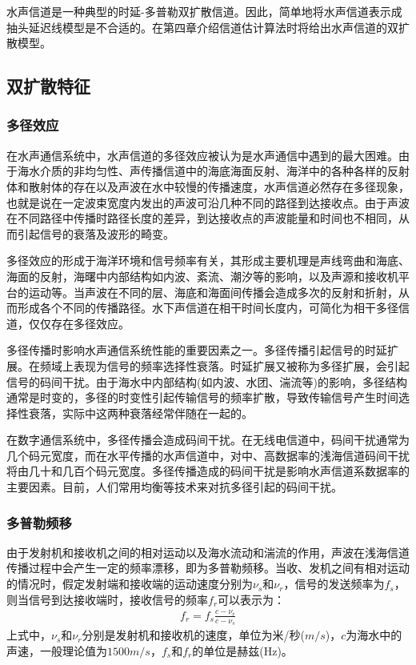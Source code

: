 水声信道是一种典型的时延-多普勒双扩散信道。因此，简单地将水声信道表示成抽头延迟线模型是不合适的。在第四章介绍信道估计算法时将给出水声信道的双扩散模型。
\subsection{双扩散特征}
\subsubsection*{多径效应}
在水声通信系统中，水声信道的多径效应被认为是水声通信中遇到的最大困难。由于海水介质的非均匀性、声传播信道中的海底海面反射、海洋中的各种各样的反射体和散射体的存在以及声波在水中较慢的传播速度，水声信道必然存在多径现象，也就是说在一定波束宽度内发出的声波可沿几种不同的路径到达接收点。由于声波在不同路径中传播时路径长度的差异，到达接收点的声波能量和时间也不相同，从而引起信号的衰落及波形的畸变。

多径效应的形成于海洋环境和信号频率有关，其形成主要机理是声线弯曲和海底、海面的反射，海曙中内部结构如内波、紊流、潮汐等的影响，以及声源和接收机平台的运动等。当声波在不同的层、海底和海面间传播会造成多次的反射和折射，从而形成各个不同的传播路径。水下声信道在相干时间长度内，可简化为相干多径信道，仅仅存在多径效应。

多径传播时影响水声通信系统性能的重要因素之一。多径传播引起信号的时延扩展。在频域上表现为信号的频率选择性衰落。时延扩展又被称为多径扩展，会引起信号的码间干扰。由于海水中内部结构(如内波、水团、湍流等)的影响，多径结构通常是时变的，多径的时变性引起传输信号的频率扩散，导致传输信号产生时间选择性衰落，实际中这两种衰落经常伴随在一起的。

在数字通信系统中，多径传播会造成码间干扰。在无线电信道中，码间干扰通常为几个码元宽度，而在水平传播的水声信道中，对中、高数据率的浅海信道码间干扰将由几十和几百个码元宽度。多径传播造成的码间干扰是影响水声信道系数据率的主要因素。目前，人们常用均衡等技术来对抗多径引起的码间干扰。
\subsubsection*{多普勒频移}
由于发射机和接收机之间的相对运动以及海水流动和湍流的作用，声波在浅海信道传播过程中会产生一定的频率漂移，即为多普勒频移。当收、发机之间有相对运动的情况时，假定发射端和接收端的运动速度分别为$\nu_s$和$\nu_r$，信号的发送频率为$f_s$，则当信号到达接收端时，接收信号的频率$f_r$可以表示为：
\begin{eqnarray}
    f_r=f_s\frac{c-\nu_r}{c-\nu_s}
    \label{equ:2.4}
\end{eqnarray}
上式中，$\nu_s$和$\nu_r$分别是发射机和接收机的速度，单位为米/秒($m/s$)，$c$为海水中的声速，一般理论值为$1500m/s$，$f_s$和$f_r$的单位是赫兹(Hz)。

